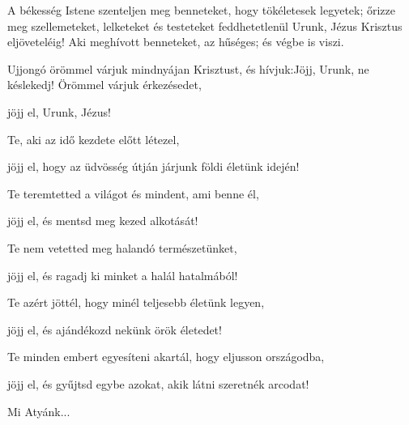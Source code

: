 \documentclass[twoside]{article}
\begin{document}
A békesség Istene szenteljen meg benneteket, hogy tökéletesek legyetek; őrizze meg szellemeteket, lelketeket és testeteket feddhetetlenül Urunk, Jézus Krisztus eljöveteléig! Aki meghívott benneteket, az hűséges; és végbe is viszi.


\begin{psalmsheet}[tone=1, continuous, initium, title={A lélek az Úrban ujjong}]
\end{psalmsheet}

\begin{preces}{Ujjongó örömmel várjuk mindnyájan Krisztust, és hívjuk:}{Jöjj, Urunk, ne késlekedj!}
  Örömmel várjuk érkezésedet,

  \reddash jöjj el, Urunk, Jézus!

  Te, aki az idő kezdete előtt létezel,

  \reddash jöjj el, hogy az üdvösség útján járjunk földi életünk idején!

  Te teremtetted a világot és mindent, ami benne él,

  \reddash jöjj el, és mentsd meg kezed alkotását!

  Te nem vetetted meg halandó természetünket,

  \reddash jöjj el, és ragadj ki minket a halál hatalmából!

  Te azért jöttél, hogy minél teljesebb életünk legyen,

  \reddash jöjj el, és ajándékozd nekünk örök életedet!

  Te minden embert egyesíteni akartál, hogy eljusson országodba,

  \reddash jöjj el, és gyűjtsd egybe azokat, akik látni szeretnék arcodat!
\end{preces}
Mi Atyánk...
\end{document}
